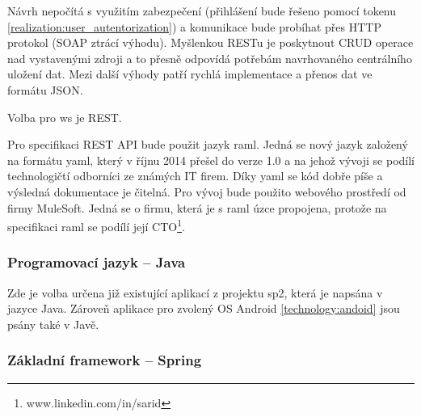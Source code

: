 \documentclass[thesis=B,czech]{FITthesis}[2012/06/26]
\begin{document}
Návrh nepočítá s využitím zabezpečení (přihlášení bude řešeno pomocí tokenu \ref{realization:user_autentorization})  a komunikace bude probíhat přes HTTP protokol (SOAP ztrácí výhodu).
Myšlenkou RESTu je poskytnout CRUD\cite{ws_compare_steve} operace nad vystavenými zdroji\cite{ws_crud} a to přesně odpovídá potřebám navrhovaného centrálního uložení dat.  Mezi další výhody patří rychlá implementace a přenos dat ve formátu JSON.

Volba pro \acrshort{ws} je REST.\newline

\label{ws_compare_mulesoft}
Pro specifikaci REST API bude použit jazyk \acrshort{raml}. Jedná se nový jazyk založený na formátu \acrshort{yaml}, který v říjnu 2014 přešel do verze 1.0\cite{ws_raml} a na jehož vývoji se podílí technologičtí odborníci ze známých IT firem\cite{ws_raml_wiki}. Díky \acrshort{yaml} se kód dobře píše a výsledná dokumentace je čitelná. Pro vývoj bude použito webového prostředí od firmy MuleSoft\cite{ws_raml_mulesoft}. Jedná se o firmu, která je s \acrshort{raml} úzce propojena, protože na specifikaci \acrshort{raml} se  podílí její CTO\footnote{www.linkedin.com/in/sarid}.
\vspace*{1\baselineskip}


\subsubsection{Programovací jazyk -- Java}

Zde je volba určena již existující aplikací z projektu \acrshort{sp2}, která je napsána v jazyce Java. Zároveň aplikace pro zvolený OS Android \ref{technology:andoid} jsou psány také v Javě.




\subsubsection{Základní framework -- Spring}
\end{document}
